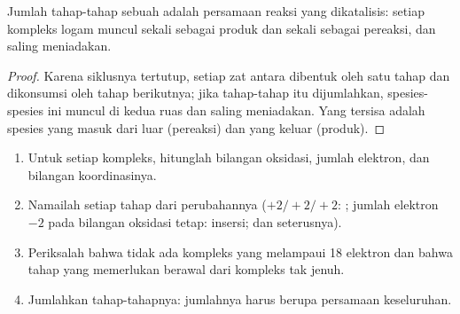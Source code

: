 \begin{proposition}\label{prop:b2:catalytic-cycles:cycle-sum}
Jumlah tahap-tahap sebuah  adalah persamaan reaksi yang
dikatalisis: setiap kompleks logam muncul sekali sebagai produk dan sekali
sebagai pereaksi, dan saling meniadakan.
\end{proposition}

\begin{proof}
Karena siklusnya tertutup, setiap zat antara dibentuk oleh satu tahap dan
dikonsumsi oleh tahap berikutnya; jika tahap-tahap itu dijumlahkan,
spesies-spesies ini muncul di kedua ruas dan saling meniadakan. Yang tersisa
adalah spesies yang masuk dari luar (pereaksi) dan yang keluar (produk).
\end{proof}

\begin{method}\label{met:b2:catalytic-cycles:read-cycle}
\begin{enumerate}
  \item Untuk setiap kompleks, hitunglah bilangan oksidasi, jumlah elektron,
        dan bilangan koordinasinya.
  \item Namailah setiap tahap dari perubahannya ($+2/+2/+2$: ; jumlah
        elektron $-2$ pada bilangan oksidasi tetap: insersi; dan seterusnya).
  \item Periksalah bahwa tidak ada kompleks yang melampaui 18 elektron dan
        bahwa tahap yang memerlukan  berawal dari kompleks tak jenuh.
  \item Jumlahkan tahap-tahapnya: jumlahnya harus berupa persamaan keseluruhan.
\end{enumerate}
\end{method}


